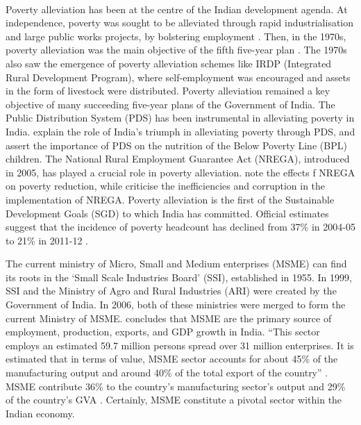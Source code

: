 \documentclass [12pt]{article}
\begin{document}
\paragraph{} Poverty alleviation has been at the centre of the Indian development agenda. At independence, poverty was sought to be alleviated through rapid industrialisation and large public works projects, by bolstering employment \parencite{balakrishnan_indias_economy}. Then, in the 1970s, poverty alleviation was the main objective of the fifth five-year plan \parencite{kapila_indian_economy}. The 1970s also saw the emergence of poverty alleviation schemes like IRDP (Integrated Rural Development Program), where self-employment was encouraged and assets in the form of livestock were distributed. Poverty alleviation remained a key objective of many succeeding five-year plans of the Government of India. The Public Distribution System (PDS) has been instrumental in alleviating poverty in India. \textcite{kumar2015public} explain the role of India's triumph in alleviating poverty through PDS, and assert the importance of PDS on the nutrition of the Below Poverty Line (BPL) children. The National Rural Employment Guarantee Act (NREGA), introduced in 2005, has played a crucial role in poverty alleviation. \textcite{klonner2022welfare} note the effects f NREGA on poverty reduction, while \textcite{Niehaus&Sukhtanker2013} criticise the inefficiencies and corruption in the implementation of NREGA. Poverty alleviation is the first of the Sustainable Development Goals (SGD) to which India has committed. Official estimates suggest that the incidence of poverty headcount has declined from 37\% in 2004-05 to 21\% in 2011-12 \autocite{planningcommission2013}.

\text The current ministry of Micro, Small and Medium enterprises (MSME) can find its roots in the `Small Scale Industries Board' (SSI), established in 1955. In 1999, SSI and the Ministry of Agro and Rural Industries (ARI) were created by the Government of India. In 2006, both of these ministries were merged to form the current Ministry of MSME.  \textcite{amutha2022role} concludes that MSME are the primary
source of employment, production, exports, and GDP growth in India.
 ``This sector employs an estimated 59.7 million persons spread over 31 million enterprises. It is estimated that in terms of value, MSME sector accounts for about 45\% of the manufacturing output and around 40\% of the total export of the country'' \parencite[739]{purakala2020role}. MSME contribute 36\% to the country's manufacturing sector's output and 29\% of the country's GVA \parencite{MSME2023}. Certainly, MSME constitute a pivotal sector within the Indian economy.
\end{document}
